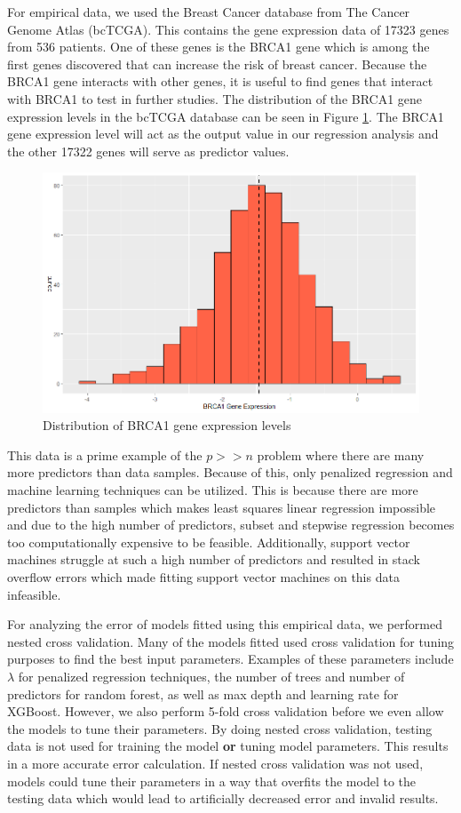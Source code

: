 \documentclass{article}
\begin{document}
For empirical data, we used the Breast Cancer database from The Cancer Genome Atlas (bcTCGA). This contains the gene expression data of 17323 genes from 536 patients. One of these genes is the BRCA1 gene which is among the first genes discovered that can increase the risk of breast cancer. Because the BRCA1 gene interacts with other genes, it is useful to find genes that interact with BRCA1 to test in further studies. The distribution of the BRCA1 gene expression levels in the bcTCGA database can be seen in Figure \ref{fig:BRCA1-distribution}. The BRCA1 gene expression level will act as the output value in our regression analysis and the other 17322 genes will serve as predictor values.

\begin{figure}[h!]
	\centering
	\includegraphics[width = 0.7\linewidth]{images/BRCA1-expression.png}
	\caption{Distribution of BRCA1 gene expression levels}
	\label{fig:BRCA1-distribution}
\end{figure}

This data is a prime example of the $p>>n$ problem where there are many more predictors than data samples. Because of this, only penalized regression and machine learning techniques can be utilized. This is because there are more predictors than samples which makes least squares linear regression impossible and due to the high number of predictors, subset and stepwise regression becomes too computationally expensive to be feasible. Additionally, support vector machines struggle at such a high number of predictors and resulted in stack overflow errors which made fitting support vector machines on this data infeasible.

For analyzing the error of models fitted using this empirical data, we performed nested cross validation. Many of the models fitted used cross validation for tuning purposes to find the best input parameters. Examples of these parameters include $\lambda$ for penalized regression techniques, the number of trees and number of predictors for random forest, as well as max depth and learning rate for XGBoost. However, we also perform 5-fold cross validation before we even allow the models to tune their parameters. By doing nested cross validation, testing data is not used for training the model \textbf{or} tuning model parameters. This results in a more accurate error calculation. If nested cross validation was not used, models could tune their parameters in a way that overfits the model to the testing data which would lead to artificially decreased error and invalid results.
\end{document}
